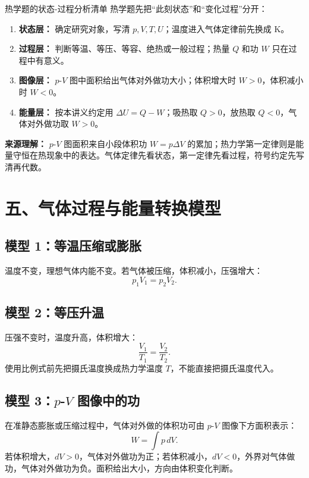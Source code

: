 \begin{learningbox}{热学题的状态-过程分析清单}
热学题先把“此刻状态”和“变化过程”分开：
\begin{enumerate}
  \item \textbf{状态层：} 确定研究对象，写清 $p,V,T,U$；温度进入气体定律前先换成 K。
  \item \textbf{过程层：} 判断等温、等压、等容、绝热或一般过程；热量 $Q$ 和功 $W$ 只在过程中有意义。
  \item \textbf{图像层：} $p$-$V$ 图中面积给出气体对外做功大小；体积增大时 $W>0$，体积减小时 $W<0$。
  \item \textbf{能量层：} 按本讲义约定用 $\Delta U=Q-W$；吸热取 $Q>0$，放热取 $Q<0$，气体对外做功取 $W>0$。
\end{enumerate}
\textbf{来源理解：} $p$-$V$ 图面积来自小段体积功 $W=p\Delta V$ 的累加；热力学第一定律则是能量守恒在热现象中的表达。气体定律先看状态，第一定律先看过程，符号约定先写清再代数。
\end{learningbox}

\section*{五、气体过程与能量转换模型}

\subsection*{模型 1：等温压缩或膨胀}

温度不变，理想气体内能不变。若气体被压缩，体积减小，压强增大：
\[
p_1V_1=p_2V_2.
\]

\subsection*{模型 2：等压升温}

压强不变时，温度升高，体积增大：
\[
\frac{V_1}{T_1}=\frac{V_2}{T_2}.
\]
使用比例式前先把摄氏温度换成热力学温度 $T$，不能直接把摄氏温度代入。

\subsection*{模型 3：$p$-$V$ 图像中的功}

在准静态膨胀或压缩过程中，气体对外做的体积功可由 $p$-$V$ 图像下方面积表示：
\[
W=\int p\,dV.
\]
若体积增大，$dV>0$，气体对外做功为正；若体积减小，$dV<0$，外界对气体做功，气体对外做功为负。面积给出大小，方向由体积变化判断。

\begin{center}


\label{fig:pv-work-area}
\end{center}

